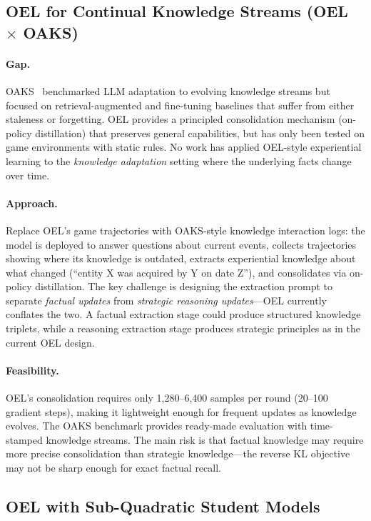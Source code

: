 \documentclass[11pt]{article}
\begin{document}
\subsection{OEL for Continual Knowledge Streams (OEL $\times$ OAKS)}

\paragraph{Gap.}
OAKS~\cite{oaks} benchmarked LLM adaptation to evolving knowledge streams but focused on retrieval-augmented and fine-tuning baselines that suffer from either staleness or forgetting.
OEL provides a principled consolidation mechanism (on-policy distillation) that preserves general capabilities, but has only been tested on game environments with static rules.
No work has applied OEL-style experiential learning to the \emph{knowledge adaptation} setting where the underlying facts change over time.

\paragraph{Approach.}
Replace OEL's game trajectories with OAKS-style knowledge interaction logs: the model is deployed to answer questions about current events, collects trajectories showing where its knowledge is outdated, extracts experiential knowledge about what changed (``entity X was acquired by Y on date Z''), and consolidates via on-policy distillation.
The key challenge is designing the extraction prompt to separate \emph{factual updates} from \emph{strategic reasoning updates}---OEL currently conflates the two.
A factual extraction stage could produce structured knowledge triplets, while a reasoning extraction stage produces strategic principles as in the current OEL design.

\paragraph{Feasibility.}
OEL's consolidation requires only 1,280--6,400 samples per round (20--100 gradient steps), making it lightweight enough for frequent updates as knowledge evolves.
The OAKS benchmark provides ready-made evaluation with time-stamped knowledge streams.
The main risk is that factual knowledge may require more precise consolidation than strategic knowledge---the reverse KL objective may not be sharp enough for exact factual recall.

\subsection{OEL with Sub-Quadratic Student Models}
\end{document}

